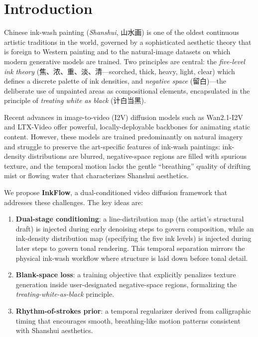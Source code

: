 \section{Introduction}
\label{sec:intro}

Chinese ink-wash painting (\emph{Shanshui}, 山水画) is one of the
oldest continuous artistic traditions in the world, governed by
a sophisticated aesthetic theory that is foreign to Western
painting and to the natural-image datasets on which modern
generative models are trained. Two principles are central:
the \emph{five-level ink theory}
(焦、浓、重、淡、清---scorched, thick, heavy, light, clear)
which defines a discrete palette of ink densities, and
\emph{negative space} (留白)---the deliberate use of unpainted
areas as compositional elements, encapsulated in the principle
of \emph{treating white as black} (计白当黑).

Recent advances in image-to-video (I2V) diffusion models such as
Wan2.1-I2V and LTX-Video offer powerful, locally-deployable
backbones for animating static content. However, these models are
trained predominantly on natural imagery and struggle to preserve
the art-specific features of ink-wash paintings: ink-density
distributions are blurred, negative-space regions are filled with
spurious texture, and the temporal motion lacks the gentle
``breathing'' quality of drifting mist or flowing water that
characterizes Shanshui aesthetics.

We propose \textbf{InkFlow}, a dual-conditioned video diffusion
framework that addresses these challenges. The key ideas are:
\begin{enumerate}
    \item \textbf{Dual-stage conditioning}: a line-distribution map
    (the artist's structural draft) is injected during early
    denoising steps to govern composition, while an ink-density
    distribution map (specifying the five ink levels) is injected
    during later steps to govern tonal rendering. This temporal
    separation mirrors the physical ink-wash workflow where
    structure is laid down before tonal detail.
    \item \textbf{Blank-space loss}: a training objective that
    explicitly penalizes texture generation inside user-designated
    negative-space regions, formalizing the
    \emph{treating-white-as-black} principle.
    \item \textbf{Rhythm-of-strokes prior}: a temporal regularizer
    derived from calligraphic timing that encourages smooth,
    breathing-like motion patterns consistent with Shanshui
    aesthetics.
\end{enumerate}


